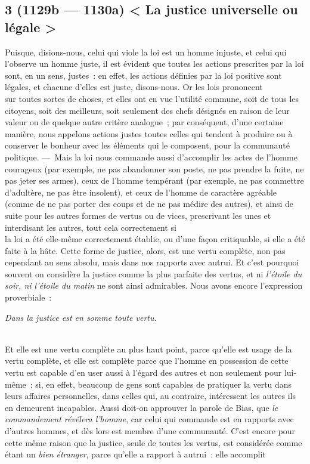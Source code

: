 \documentclass[french,twoside]{book} %
\begin{document}
\subsection[{3 (1129b — 1130a) < La justice universelle ou légale >}]{3 (1129b — 1130a) < La justice universelle ou légale >}
\noindent Puisque, disions-nous, celui qui viole la loi est un homme injuste, et celui qui l’observe un homme juste, il est évident que toutes les actions prescrites par la loi sont, en un sens, justes : en effet, les actions définies par la loi positive sont légales, et chacune d’elles est juste, disons-nous. Or les lois prononcent \\
sur toutes sortes de choses, et elles ont en vue l’utilité commune, soit de tous les citoyens, soit des meilleurs, soit seulement des chefs désignés en raison de leur valeur ou de quelque autre critère analogue ; par conséquent, d’une certaine manière, nous appelons actions justes toutes celles qui tendent à produire ou à conserver le bonheur avec les éléments qui le composent, pour la communauté politique. — Mais la loi nous commande aussi d’accomplir les actes de l’homme \\
courageux (par exemple, ne pas abandonner son poste, ne pas prendre la fuite, ne pas jeter ses armes), ceux de l’homme tempérant (par exemple, ne pas commettre d’adultère, ne pas être insolent), et ceux de l’homme de caractère agréable (comme de ne pas porter des coups et de ne pas médire des autres), et ainsi de suite pour les autres formes de vertus ou de vices, prescrivant les unes et interdisant les autres, tout cela correctement si \\
la loi a été elle-même correctement établie, ou d’une façon critiquable, si elle a été faite à la hâte. Cette forme de justice, alors, est une vertu complète, non pas cependant au sens absolu, mais dans nos rapports avec autrui. Et c’est pourquoi souvent on considère la justice comme la plus parfaite des vertus, et ni {\itshape l’étoile du soir, ni l’étoile du matin} ne sont ainsi admirables. Nous avons encore l’expression proverbiale :\par
 {\itshape Dans la justice est en somme toute vertu.} \par
\\
Et elle est une vertu complète au plus haut point, parce qu’elle est usage de la vertu complète, et elle est complète parce que l’homme en possession de cette vertu est capable d’en user aussi à l’égard des autres et non seulement pour lui-même : si, en effet, beaucoup de gens sont capables de pratiquer la vertu dans leurs affaires personnelles, dans celles qui,  au contraire, intéressent les autres ils en demeurent incapables. Aussi doit-on approuver la parole de Bias, que {\itshape le commandement révélera l’homme}, car celui qui commande est en rapports avec d’autres hommes, et dès lors est membre d’une communauté. C’est encore pour cette même raison que la justice, seule de toutes les vertus, est considérée comme étant un {\itshape bien étranger}, parce qu’elle a rapport à autrui : elle accomplit \\
\end{document}
